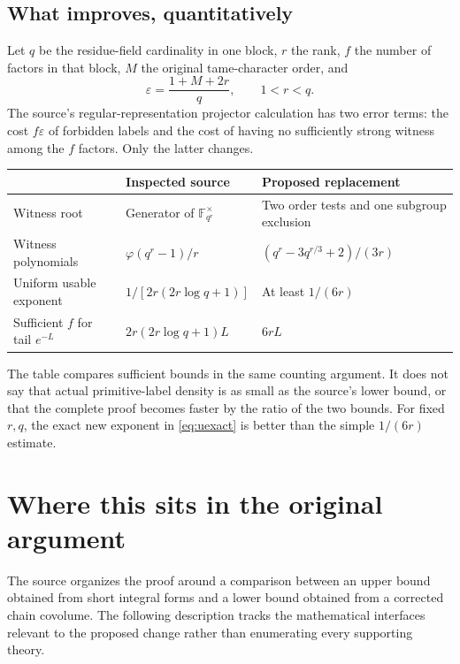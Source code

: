 \documentclass[11pt,a4paper]{article}
\theoremstyle{definition}
\theoremstyle{remark}
\newcommand{\F}{\mathbb F}
\begin{document}
\subsection{What improves, quantitatively}

Let \(q\) be the residue-field cardinality in one block, \(r\) the rank, \(f\) the number
of factors in that block, \(M\) the original tame-character order, and
\[
  \varepsilon=\frac{1+M+2r}{q},\qquad 1<r<q.
\]
The source's regular-representation projector calculation has two error terms:
the cost \(f\varepsilon\) of forbidden labels and the cost of having no sufficiently
strong witness among the \(f\) factors. Only the latter changes.

\begin{center}
\begin{tabularx}{\textwidth}{@{}lXX@{}}
\toprule
 & Inspected source & Proposed replacement\\
\midrule
Witness root & Generator of \(\F_{q^r}^{\times}\) & Two order tests and one subgroup exclusion\\
Witness polynomials & \(\varphi(q^r-1)/r\) & \((q^r-3q^{r/3}+2)/(3r)\)\\
Uniform usable exponent & \(1/[2r(2r\log q+1)]\) & At least \(1/(6r)\)\\
Sufficient \(f\) for tail \(e^{-L}\) & \(2r(2r\log q+1)L\) & \(6rL\)\\
\bottomrule
\end{tabularx}
\end{center}

The table compares sufficient bounds in the same counting argument.
It does not say that actual primitive-label density is as small as the source's lower
bound, or that the complete proof becomes faster by the ratio of the two bounds.
For fixed \(r,q\), the exact new exponent in \eqref{eq:uexact} is better than the
simple \(1/(6r)\) estimate.

\section{Where this sits in the original argument}
\label{sec:architecture}

The source organizes the proof around a comparison between an upper bound obtained
from short integral forms and a lower bound obtained from a corrected chain
covolume. The following description tracks the mathematical interfaces relevant
to the proposed change rather than enumerating every supporting theory.
\end{document}
